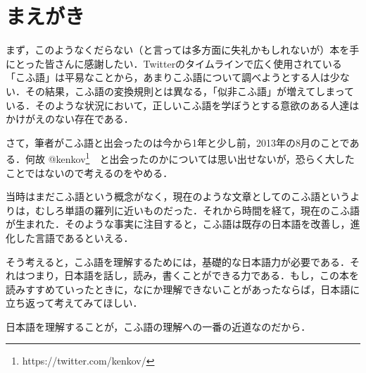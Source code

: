 \chapter*{まえがき}
まず，このようなくだらない（と言っては多方面に失礼かもしれないが）本を手にとった皆さんに感謝したい．Twitterのタイムラインで広く使用されている「こふ語」は平易なことから，あまりこふ語について調べようとする人は少ない．その結果，こふ語の変換規則とは異なる，「似非こふ語」が増えてしまっている．そのような状況において，正しいこふ語を学ぼうとする意欲のある人達はかけがえのない存在である．

\vspace{2em}

さて，筆者がこふ語と出会ったのは今から1年と少し前，2013年の8月のことである．何故 @kenkov\footnote{https://twitter.com/kenkov/}　と出会ったのかについては思い出せないが，恐らく大したことではないので考えるのをやめる．\par
当時はまだこふ語という概念がなく，現在のような文章としてのこふ語というよりは，むしろ単語の羅列に近いものだった．それから時間を経て，現在のこふ語が生まれた．そのような事実に注目すると，こふ語は既存の日本語を改善し，進化した言語であるといえる．\par
そう考えると，こふ語を理解するためには，基礎的な日本語力が必要である．それはつまり，日本語を話し，読み，書くことができる力である．もし，この本を読みすすめていったときに，なにか理解できないことがあったならば，日本語に立ち返って考えてみてほしい．\par
日本語を理解することが，こふ語の理解への一番の近道なのだから．